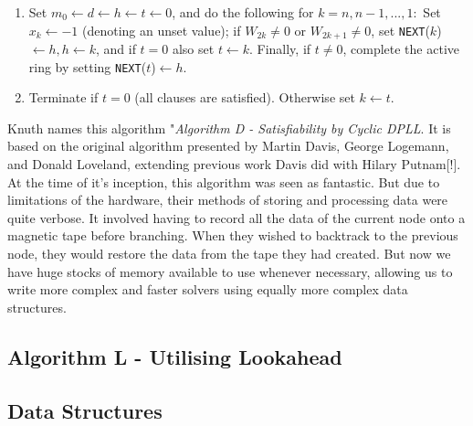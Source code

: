 \documentclass{article}
\begin{document}
\begin{enumerate}
    \item Set $m_0 \leftarrow d \leftarrow h \leftarrow t \leftarrow 0$, and do the following for $k = n, n - 1, ..., 1:$ Set $x_k ← -1$ (denoting an unset value); if $W_{2k} \neq 0$ or $W_{2k+1} \neq 0$, set \texttt{NEXT}($k$) $ \leftarrow h, h \leftarrow k$, and if $t = 0$ also set $t \leftarrow k$. Finally, if $t \neq 0$, complete the active ring by setting \texttt{NEXT}($t$)$ \leftarrow h$.
    \item Terminate if $t = 0$ (all clauses are satisfied). Otherwise set $k \leftarrow t$.
\end{enumerate}

Knuth names this algorithm "\textit{Algorithm D - Satisfiability by Cyclic DPLL}. It is based on the
original algorithm presented by Martin Davis, George Logemann, and Donald Loveland\cite{dpll},
extending previous work Davis did with Hilary Putnam[!]. At the time of it's inception, this
algorithm was seen as fantastic. But due to limitations of the hardware, their methods of storing
and processing data were quite verbose. It involved having to record all the data of the current
node onto a magnetic tape before branching. When they wished to backtrack to the previous node,
they would restore the data from the tape they had created. But now we have huge stocks of memory
available to use whenever necessary, allowing us to write more complex and faster solvers using
equally more complex data structures.

\subsection{Algorithm L - Utilising Lookahead}
\lipsum[1-5]

\subsection{Data Structures}
\lipsum[1-5]


\end{document}
